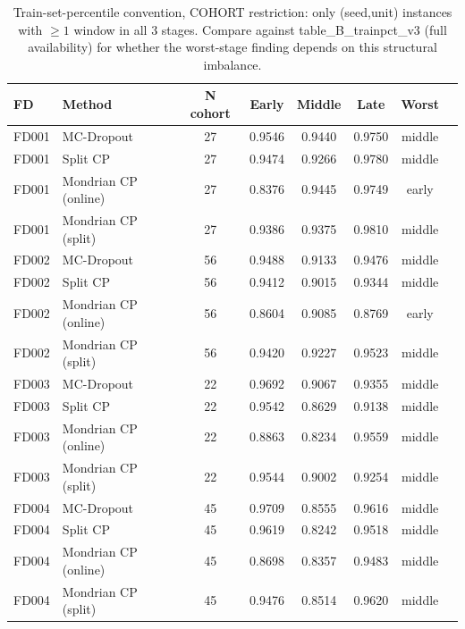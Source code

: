 \begin{table}[t]
\caption{Train-set-percentile convention, COHORT restriction: only (seed,unit) instances with $\geq 1$ window in all 3 stages. Compare against table\_B\_trainpct\_v3 (full availability) for whether the worst-stage finding depends on this structural imbalance.}
\label{tab:trainpct-cohort}
\centering
\small
\begin{tabular}{llcccccc}
\toprule
FD & Method & N cohort & Early & Middle & Late & Worst \\
\midrule
FD001 & MC-Dropout & 27 & 0.9546 & 0.9440 & 0.9750 & middle \\
FD001 & Split CP & 27 & 0.9474 & 0.9266 & 0.9780 & middle \\
FD001 & Mondrian CP (online) & 27 & 0.8376 & 0.9445 & 0.9749 & early \\
FD001 & Mondrian CP (split) & 27 & 0.9386 & 0.9375 & 0.9810 & middle \\
FD002 & MC-Dropout & 56 & 0.9488 & 0.9133 & 0.9476 & middle \\
FD002 & Split CP & 56 & 0.9412 & 0.9015 & 0.9344 & middle \\
FD002 & Mondrian CP (online) & 56 & 0.8604 & 0.9085 & 0.8769 & early \\
FD002 & Mondrian CP (split) & 56 & 0.9420 & 0.9227 & 0.9523 & middle \\
FD003 & MC-Dropout & 22 & 0.9692 & 0.9067 & 0.9355 & middle \\
FD003 & Split CP & 22 & 0.9542 & 0.8629 & 0.9138 & middle \\
FD003 & Mondrian CP (online) & 22 & 0.8863 & 0.8234 & 0.9559 & middle \\
FD003 & Mondrian CP (split) & 22 & 0.9544 & 0.9002 & 0.9254 & middle \\
FD004 & MC-Dropout & 45 & 0.9709 & 0.8555 & 0.9616 & middle \\
FD004 & Split CP & 45 & 0.9619 & 0.8242 & 0.9518 & middle \\
FD004 & Mondrian CP (online) & 45 & 0.8698 & 0.8357 & 0.9483 & middle \\
FD004 & Mondrian CP (split) & 45 & 0.9476 & 0.8514 & 0.9620 & middle \\
\bottomrule
\end{tabular}
\end{table}
